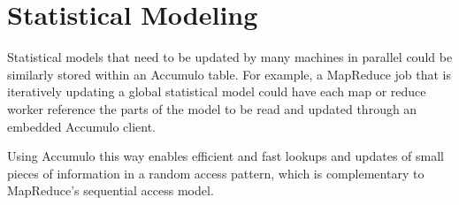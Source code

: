 \section{Statistical Modeling}

Statistical models that need to be updated by many machines in parallel could be
similarly stored within an Accumulo table. For example, a MapReduce job that is
iteratively updating a global statistical model could have each map or reduce worker
reference the parts of the model to be read and updated through an embedded
Accumulo client.

Using Accumulo this way enables efficient and fast lookups and updates of small
pieces of information in a random access pattern, which is complementary to
MapReduce's sequential access model.

